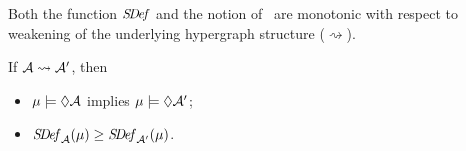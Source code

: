 Both the function $\mathit{S\mskip-3.5muD\mskip-2.5mue\mskip-1.5muf}$ and the notion of
\scibility\ are monotonic with respect to weakening of the underlying hypergraph structure ($\rightsquigarrow$).
% 
\begin{theorem}
        \label{theorem:strong-mono}
    If
    $\mathcal A \rightsquigarrow \mathcal A'$, then
    \begin{itemize}[nosep]
    \item 
     $\mu \models \Diamond \mathcal A$ implies $\mu \models \Diamond \mathcal A'$;
    \item 
    $\mathit{S\mskip-3.5muD\mskip-2.5mue\mskip-1.5muf}_{\mathcal A}(\mu) \ge \mathit{S\mskip-3.5muD\mskip-2.5mue\mskip-1.5muf}_{\mathcal A'}(\mu)$. 
    \end{itemize} 
\end{theorem}


